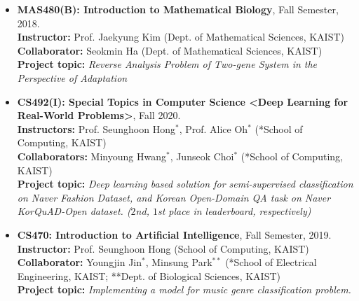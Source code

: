 \documentclass[10pt,a4]{article}
\begin{document}
\begin{small}
\begin{itemize}
	\item {\bf MAS480(B): Introduction to Mathematical Biology}, Fall Semester, 2018. \\
	{\bf Instructor:} Prof. Jaekyung Kim (Dept. of Mathematical Sciences, KAIST) \\
	{\bf Collaborator:} Seokmin Ha (Dept. of Mathematical Sciences, KAIST) \\
	{\bf Project topic:} {\it Reverse Analysis Problem of Two-gene System in the
		Perspective of Adaptation} \\
	
	\item {\bf CS492(I): Special Topics in Computer Science <Deep Learning for Real-World Problems>}, Fall 2020. \\
	{\bf Instructors:} Prof. Seunghoon Hong$^{*}$, Prof. Alice Oh$^{*}$ (*School of Computing, KAIST) \\
	{\bf Collaborators:} Minyoung Hwang$^{*}$, Junseok Choi$^{*}$ (*School of Computing, KAIST) \\
	{\bf Project topic:} {\it Deep learning based solution for semi-supervised classification on Naver Fashion Dataset, and Korean Open-Domain QA task on Naver KorQuAD-Open dataset. ($2$nd, $1$st place in leaderboard, respectively)} \\
	
	\item {\bf CS470: Introduction to Artificial Intelligence}, Fall Semester, 2019. \\
	{\bf Instructor:} Prof. Seunghoon Hong (School of Computing, KAIST) \\
	{\bf Collaborator:} Youngjin Jin$^{*}$, Minsung Park$^{**}$ (*School of Electrical Engineering, KAIST; **Dept. of Biological Sciences, KAIST) \\
	{\bf Project topic:} {\it Implementing a model for music genre classification problem.} \\
%	
	

\end{itemize}
\end{small}
\end{document}
